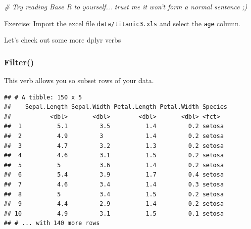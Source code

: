 \documentclass[
]{article}
\newenvironment{Shaded}{\begin{snugshade}}{\end{snugshade}}
\newcommand{\CommentTok}[1]{\textcolor[rgb]{0.56,0.35,0.01}{\textit{#1}}}
\newcommand{\FloatTok}[1]{\textcolor[rgb]{0.00,0.00,0.81}{#1}}
\newcommand{\KeywordTok}[1]{\textcolor[rgb]{0.13,0.29,0.53}{\textbf{#1}}}
\newcommand{\NormalTok}[1]{#1}
\newcommand{\OperatorTok}[1]{\textcolor[rgb]{0.81,0.36,0.00}{\textbf{#1}}}
\newcommand{\StringTok}[1]{\textcolor[rgb]{0.31,0.60,0.02}{#1}}
\begin{document}
\begin{Shaded}
\begin{Highlighting}[]
\CommentTok{# Try reading Base R to yourself... trust me it won't form a normal sentence ;)}
\end{Highlighting}
\end{Shaded}

Exercise: Import the excel file \texttt{data/titanic3.xls} and select
the \texttt{age} column.

Let's check out some more dplyr verbs

\hypertarget{filter}{%
\subsubsection{Filter()}\label{filter}}

This verb allows you so subset rows of your data.

\begin{Shaded}
\end{Shaded}

\begin{verbatim}
## # A tibble: 150 x 5
##    Sepal.Length Sepal.Width Petal.Length Petal.Width Species
##           <dbl>       <dbl>        <dbl>       <dbl> <fct>  
##  1          5.1         3.5          1.4         0.2 setosa 
##  2          4.9         3            1.4         0.2 setosa 
##  3          4.7         3.2          1.3         0.2 setosa 
##  4          4.6         3.1          1.5         0.2 setosa 
##  5          5           3.6          1.4         0.2 setosa 
##  6          5.4         3.9          1.7         0.4 setosa 
##  7          4.6         3.4          1.4         0.3 setosa 
##  8          5           3.4          1.5         0.2 setosa 
##  9          4.4         2.9          1.4         0.2 setosa 
## 10          4.9         3.1          1.5         0.1 setosa 
## # ... with 140 more rows
\end{verbatim}
\end{document}

